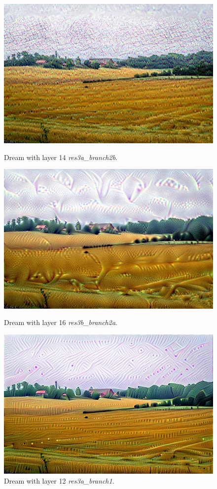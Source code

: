 \begin{figure}[H]
	\centering
	\includegraphics[width=1\linewidth]{img/14_alpsted-landscape_res3a_branch2b.jpg}
	\caption{Dream with layer 14 \emph{res3a\_branch2b}.}
	\label{fig:14-landscape}
	\endminipage\hfill
	\centering
	\includegraphics[width=1\linewidth]{img/16_alpsted-landscape_res3b_branch2a.jpg}
	\caption{Dream with layer 16 \emph{res3b\_branch2a}.}
	\label{fig:16-landscape}
	\endminipage\hfill
	\centering
	\includegraphics[width=1\linewidth]{img/alpsted-landscape_res3a_branch1.jpg}
	\caption{Dream with layer 12 \emph{res3a\_branch1}.}
	\label{fig:layer-artistic}
	\endminipage\hfill
\end{figure}

